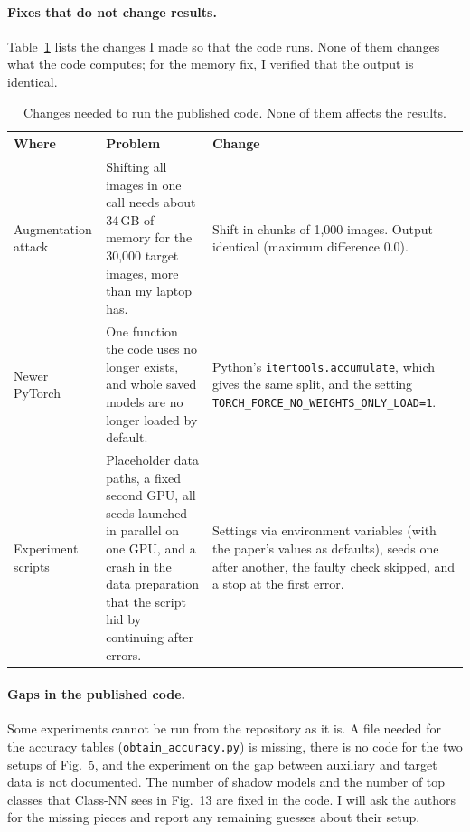 \documentclass[a4paper]{article}
\begin{document}
\paragraph{Fixes that do not change results.}
Table~\ref{tab:fixes} lists the changes I made so that the code runs.
None of them changes what the code computes; for the memory fix, I verified that the output is identical.

\begin{table}[!htb]
  \centering
  \small
  \renewcommand{\arraystretch}{1.2}
  \begin{tabularx}{\textwidth}{@{}l X X@{}}
    \toprule
    Where & Problem & Change \\
    \midrule
    Augmentation attack & Shifting all images in one call needs about 34\,GB of memory for the 30{,}000 target images, more than my laptop has. & Shift in chunks of 1{,}000 images. Output identical (maximum difference 0.0). \\
    Newer PyTorch & One function the code uses no longer exists, and whole saved models are no longer loaded by default. & Python's \texttt{itertools.accumulate}, which gives the same split, and the setting \texttt{TORCH\_\allowbreak FORCE\_\allowbreak NO\_\allowbreak WEIGHTS\_\allowbreak ONLY\_\allowbreak LOAD=1}. \\
    Experiment scripts & Placeholder data paths, a fixed second GPU, all seeds launched in parallel on one GPU, and a crash in the data preparation that the script hid by continuing after errors. & Settings via environment variables (with the paper's values as defaults), seeds one after another, the faulty check skipped, and a stop at the first error. \\
    \bottomrule
  \end{tabularx}
  \caption{Changes needed to run the published code. None of them affects the results.}
  \label{tab:fixes}
\end{table}

\paragraph{Gaps in the published code.}
Some experiments cannot be run from the repository as it is.
A file needed for the accuracy tables (\texttt{obtain\_accuracy.py}) is missing, there is no code for the two setups of Fig.~5, and the experiment on the gap between auxiliary and target data is not documented.
The number of shadow models and the number of top classes that Class-NN sees in Fig.~13 are fixed in the code.
I will ask the authors for the missing pieces and report any remaining guesses about their setup.
\end{document}

